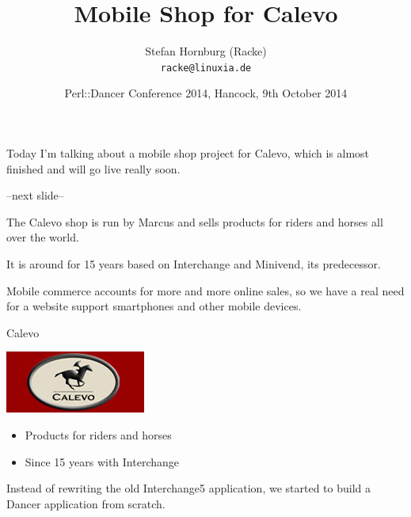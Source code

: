 \usepackage[utf8]{inputenc}
\usepackage[T1]{fontenc}
\usepackage{mathptmx}
\usepackage[scaled=.90]{helvet}
\usepackage{courier}
\usepackage{caption}
\captionsetup{labelformat=empty,labelsep=none}
\usepackage{verbatim}
\usepackage{hyperref}
\usepackage{listings}
\usepackage{ulem}
\lstset{language=Perl,basicstyle=\normalsize,tabsize=3,showstringspaces=false}

\title{Mobile Shop for Calevo}
\author[racke]{Stefan Hornburg (Racke)\\  \texttt{racke@linuxia.de}}
\date{Perl::Dancer Conference 2014, Hancock, 9th October 2014}


\maketitle{}

\begin{frame}
  \titlepage
\end{frame}

\tableofcontents

Today I'm talking about a mobile shop project for Calevo, which
is almost finished and will go live really soon.

--next slide--

The Calevo shop is run by Marcus and sells products for riders
and horses all over the world.

It is around for 15 years based on Interchange and Minivend,
its predecessor. 

Mobile commerce accounts for more and more online sales, so we have a real need for a
website support smartphones and other mobile devices.

\begin{frame}{Calevo}
\begin{center}
  \includegraphics{pics/calevo.jpg}
\end{center}
\begin{itemize}
\item Products for riders and horses
\item Since 15 years with Interchange 
\end{itemize}
\end{frame}

Instead of rewriting the old Interchange5 application, we started
to build a Dancer application from scratch.

